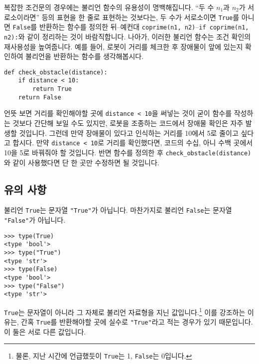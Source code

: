 \documentclass[../main.tex]{subfiles}
\begin{document}
복잡한 조건문의 경우에는 불리언 함수의 유용성이 명백해집니다.
``두 수 $n_1$과 $n_2$가 서로소이라면'' 등의 표현을 한 줄로 표현하는 것보다는, 두 수가 서로소이면 \texttt{True}를 아니면 \texttt{False}를 반환하는 함수를 정의한 뒤--예컨대 \texttt{coprime(n1, n2)}--\texttt{if coprime(n1, n2):}와 같이 정리하는 것이 바람직합니다.
나아가, 이러한 불리언 함수는 조건 확인의 재사용성을 높여줍니다.
예를 들어, 로봇이 거리를 체크한 후 장애물이 앞에 있는지 확인하여 불리언을
반환하는 함수를 생각해봅시다.
\begin{verbatim}
def check_obstacle(distance):
    if distance < 10:
        return True
    return False
\end{verbatim}
언뜻 보면 거리를 확인해야할 곳에 \verb|distance < 10|을 써넣는 것이 굳이 함수를
작성하는 것보다 간단해 보일 수도 있지만, 로봇을 조종하는 코드에서 장애물 확인은
자주 발생할 것입니다.
그런데 만약 장애물이 있다고 인식하는 거리를 10에서 5로 줄이고 싶다고 합시다.
만약 \verb|distance < 10|로 거리를 확인했다면, 코드의 수십, 아니 수백 곳에서
10을 5로 바꿔줘야 할 것입니다.
반면 함수를 정의한 후 \verb|check_obstacle(distance)|와 같이 사용했다면 단 한
곳만 수정하면 될 것입니다.

\subsection{유의 사항}
불리언 \texttt{True}는 문자열 \texttt{"True"}가 아닙니다.
마찬가지로 불리언 \texttt{False}는 문자열 \texttt{"False"}가 아닙니다.
\begin{verbatim}
>>> type(True)
<type 'bool'>
>>> type("True")
<type 'str'>
>>> type(False)
<type 'bool'>
>>> type("False")
<type 'str'>
\end{verbatim}
\texttt{True}는 문자열이 아니라 그 자체로 불리언 자료형을 지닌 값입니다.\footnote{물론, 지난 시간에 언급했듯이 \texttt{True}는 1, \texttt{False}는 0입니다.}
이를 강조하는 이유는, 간혹 \verb|True|를 반환해야할 곳에 실수로
\verb|"True"|라고 적는 경우가 있기 때문입니다.
이 둘은 서로 다른 값입니다.
\end{document}
